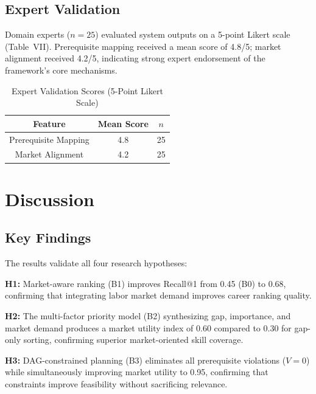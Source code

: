 \documentclass[conference]{IEEEtran}
\begin{document}
\subsection{Expert Validation}

Domain experts ($n{=}25$) evaluated system outputs on a 5-point Likert scale (Table~VII). Prerequisite mapping received a mean score of 4.8/5; market alignment received 4.2/5, indicating strong expert endorsement of the framework's core mechanisms.

\begin{table}[htbp]
    \caption{Expert Validation Scores (5-Point Likert Scale)}
    \begin{center}
        \begin{tabular}{|c|c|c|}
            \hline
            \textbf{Feature} & \textbf{Mean Score} & \textbf{$n$} \\
            \hline
            Prerequisite Mapping  & 4.8 & 25 \\
            \hline
            Market Alignment      & 4.2 & 25 \\
            \hline
        \end{tabular}
        \label{tab:expert}
    \end{center}
\end{table}

\section{Discussion}

\subsection{Key Findings}

The results validate all four research hypotheses:

\textbf{H1:} Market-aware ranking (B1) improves Recall@1 from 0.45 (B0) to 0.68, confirming that integrating labor market demand improves career ranking quality.

\textbf{H2:} The multi-factor priority model (B2) synthesizing gap, importance, and market demand produces a market utility index of 0.60 compared to 0.30 for gap-only sorting, confirming superior market-oriented skill coverage.

\textbf{H3:} DAG-constrained planning (B3) eliminates all prerequisite violations ($V{=}0$) while simultaneously improving market utility to 0.95, confirming that constraints improve feasibility without sacrificing relevance.
\end{document}
